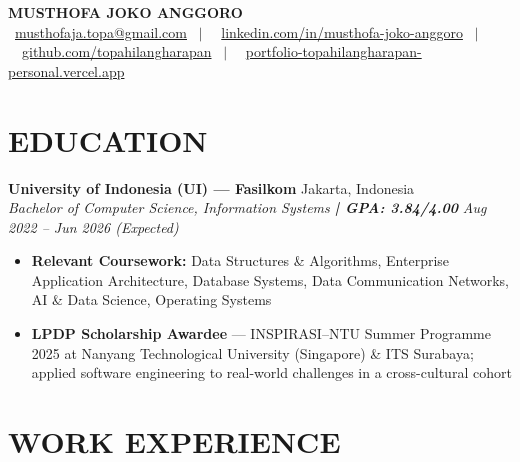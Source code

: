 \documentclass[10pt,a4paper]{article}
\newcommand{\contactline}[1]{\small #1}
\newcommand{\experienceheader}[4]{
    \textbf{#1} \hfill #2 \\
    \textit{#3} \hfill \textit{#4}
}
\begin{document}
\begin{center}
    {\LARGE \textbf{MUSTHOFA JOKO ANGGORO}} \\[2pt]
    \contactline{
        \faEnvelope\ \href{mailto:musthofaja.topa@gmail.com}{musthofaja.topa@gmail.com} \ $|$ \ 
        \faLinkedin\ \href{https://www.linkedin.com/in/musthofa-joko-anggoro/}{linkedin.com/in/musthofa-joko-anggoro} \ $|$ \
        \faGithub\ \href{https://github.com/topahilangharapan}{github.com/topahilangharapan} \ $|$ \
        \faGlobe\ \href{https://portfolio-topahilangharapan-personal.vercel.app/}{portfolio-topahilangharapan-personal.vercel.app}
    }
\end{center}

\vspace{-8pt}

\section*{EDUCATION}

\experienceheader{University of Indonesia (UI) — Fasilkom}{Jakarta, Indonesia}{Bachelor of Computer Science, Information Systems \textbf{| GPA: 3.84/4.00}}{Aug 2022 -- Jun 2026 (Expected)}
\begin{itemize}[leftmargin=*, itemsep=0.5pt, topsep=1pt]
    \item \textbf{Relevant Coursework:} Data Structures \& Algorithms, Enterprise Application Architecture, Database Systems, Data Communication Networks, AI \& Data Science, Operating Systems
    \item \textbf{LPDP Scholarship Awardee} — INSPIRASI--NTU Summer Programme 2025 at Nanyang Technological University (Singapore) \& ITS Surabaya; applied software engineering to real-world challenges in a cross-cultural cohort
\end{itemize}

\vspace{-4pt}

\section*{WORK EXPERIENCE}
\end{document}
